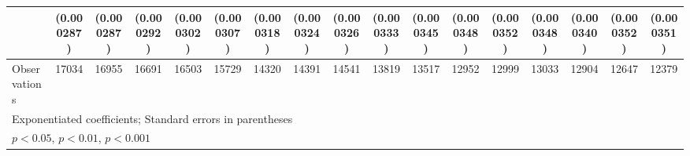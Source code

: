 {\begin{tabular}{l*{16}{c}}
                    &  (0.000287)         &  (0.000287)         &  (0.000292)         &  (0.000302)         &  (0.000307)         &  (0.000318)         &  (0.000324)         &  (0.000326)         &  (0.000333)         &  (0.000345)         &  (0.000348)         &  (0.000352)         &  (0.000348)         &  (0.000340)         &  (0.000352)         &  (0.000351)         \\
\hline
Observations        &       17034         &       16955         &       16691         &       16503         &       15729         &       14320         &       14391         &       14541         &       13819         &       13517         &       12952         &       12999         &       13033         &       12904         &       12647         &       12379         \\
\hline\hline
\multicolumn{17}{l}{\footnotesize Exponentiated coefficients; Standard errors in parentheses}\\
\multicolumn{17}{l}{\footnotesize \sym{*} \(p<0.05\), \sym{**} \(p<0.01\), \sym{***} \(p<0.001\)}\\
\end{tabular}
}
